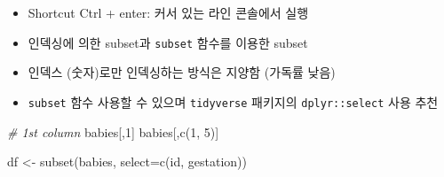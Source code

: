 \documentclass[
]{book}
\newenvironment{Shaded}{\begin{snugshade}}{\end{snugshade}}
\newcommand{\AttributeTok}[1]{\textcolor[rgb]{0.77,0.63,0.00}{#1}}
\newcommand{\CommentTok}[1]{\textcolor[rgb]{0.56,0.35,0.01}{\textit{#1}}}
\newcommand{\ConstantTok}[1]{\textcolor[rgb]{0.00,0.00,0.00}{#1}}
\newcommand{\DecValTok}[1]{\textcolor[rgb]{0.00,0.00,0.81}{#1}}
\newcommand{\DocumentationTok}[1]{\textcolor[rgb]{0.56,0.35,0.01}{\textbf{\textit{#1}}}}
\newcommand{\FunctionTok}[1]{\textcolor[rgb]{0.00,0.00,0.00}{#1}}
\newcommand{\NormalTok}[1]{#1}
\newcommand{\OtherTok}[1]{\textcolor[rgb]{0.56,0.35,0.01}{#1}}
\newcommand{\SpecialCharTok}[1]{\textcolor[rgb]{0.00,0.00,0.00}{#1}}
\newcommand{\StringTok}[1]{\textcolor[rgb]{0.31,0.60,0.02}{#1}}
\providecommand{\tightlist}{%
  \setlength{\itemsep}{0pt}\setlength{\parskip}{0pt}}
\begin{document}
\begin{itemize}
\tightlist
\item
  Shortcut Ctrl + enter: 커서 있는 라인 콘솔에서 실행
\item
  인덱싱에 의한 subset과 \texttt{subset} 함수를 이용한 subset
\end{itemize}

\begin{Shaded}
\end{Shaded}

\begin{itemize}
\tightlist
\item
  인덱스 (숫자)로만 인덱싱하는 방식은 지양함 (가독률 낮음)
\item
  \texttt{subset} 함수 사용할 수 있으며 \texttt{tidyverse} 패키지의 \texttt{dplyr::select} 사용 추천
\end{itemize}

\begin{Shaded}
\begin{Highlighting}[]
\CommentTok{\# 1st column}
\NormalTok{babies[,}\DecValTok{1}\NormalTok{]}
\NormalTok{babies[,}\FunctionTok{c}\NormalTok{(}\DecValTok{1}\NormalTok{, }\DecValTok{5}\NormalTok{)]}

\NormalTok{df }\OtherTok{\textless{}{-}} \FunctionTok{subset}\NormalTok{(babies, }\AttributeTok{select=}\FunctionTok{c}\NormalTok{(id, gestation))}
\end{Highlighting}
\end{Shaded}
\end{document}
